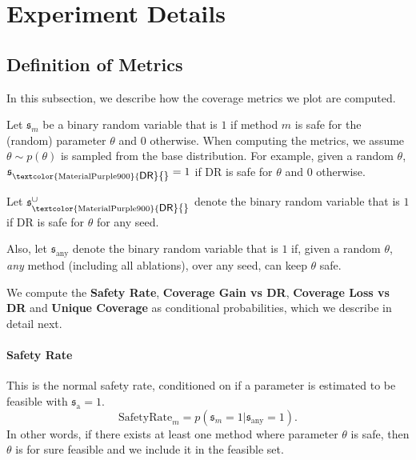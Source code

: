 \documentclass{article} %
\newcommand{\AlgDR}{\textcolor{MaterialPurple900}{\small\textsf{DR}}}
\begin{document}
\FloatBarrier


\section{Experiment Details} \label{app:experiment_details}

\subsection{Definition of Metrics} \label{app:coverage_metrics}
In this subsection, we describe how the coverage metrics we plot are computed.

Let $\mathfrak{s}_{m}$ be a binary random variable that is $1$ if method $m$ is safe for the (random) parameter $\theta$ and $0$ otherwise.
When computing the metrics, we assume $\theta \sim p(\theta)$ is sampled from the base distribution.
For example, given a random $\theta$, $\mathfrak{s}_{\text{\AlgDR{}}}=1$ if \AlgDR{} is safe for $\theta$ and $0$ otherwise.

Let $\mathfrak{s}^{\cup}_{\text{\AlgDR{}}}$ denote the binary random variable that is $1$ if \AlgDR{} is safe for $\theta$ for any seed.

Also, let $\mathfrak{s}_{\text{any}}$ denote the binary random variable that is $1$ if, given a random $\theta$, \textit{any} method (including all ablations), over any seed, can keep $\theta$ safe.

We compute the \textbf{Safety Rate}, \textbf{Coverage Gain vs DR}, \textbf{Coverage Loss vs DR} and \textbf{Unique Coverage} as conditional probabilities, which we describe in detail next.

\paragraph{Safety Rate} This is the normal safety rate, conditioned on if a parameter is estimated to be feasible with $\mathfrak{s}_{\text{a}} = 1$.
\begin{equation}
    \text{SafetyRate}_{m} = p( \mathfrak{s}_{m} = 1 | \mathfrak{s}_{\text{any}}=1).
\end{equation}
In other words, if there exists at least one method where parameter $\theta$ is safe, then $\theta$ is for sure feasible and we include it in the feasible set.
\end{document}

